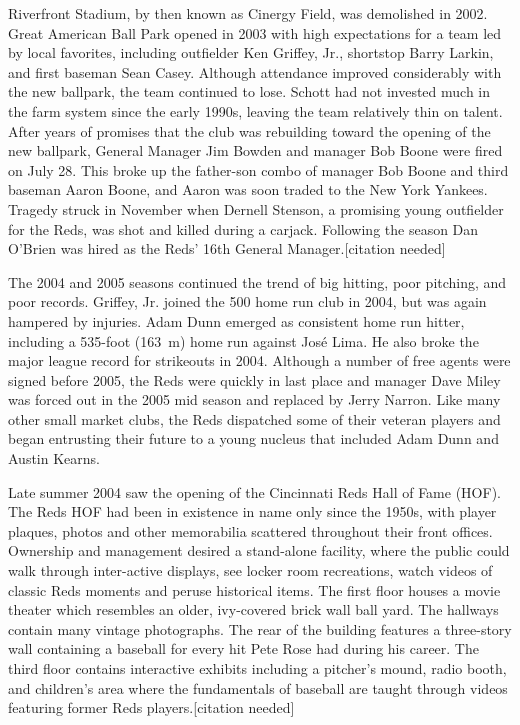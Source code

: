Riverfront Stadium, by then known as Cinergy Field, was demolished in
2002. Great American Ball Park opened in 2003 with high expectations for
a team led by local favorites, including outfielder Ken Griffey, Jr.,
shortstop Barry Larkin, and first baseman Sean Casey. Although
attendance improved considerably with the new ballpark, the team
continued to lose. Schott had not invested much in the farm system since
the early 1990s, leaving the team relatively thin on talent. After years
of promises that the club was rebuilding toward the opening of the new
ballpark, General Manager Jim Bowden and manager Bob Boone were fired on
July 28. This broke up the father-son combo of manager Bob Boone and
third baseman Aaron Boone, and Aaron was soon traded to the New York
Yankees. Tragedy struck in November when Dernell Stenson, a promising
young outfielder for the Reds, was shot and killed during a carjack.
Following the season Dan O'Brien was hired as the Reds' 16th General
Manager.{[}citation needed{]}

The 2004 and 2005 seasons continued the trend of big hitting, poor
pitching, and poor records. Griffey, Jr. joined the 500 home run club in
2004, but was again hampered by injuries. Adam Dunn emerged as
consistent home run hitter, including a 535-foot (163~m) home run
against José Lima. He also broke the major league record for strikeouts
in 2004. Although a number of free agents were signed before 2005, the
Reds were quickly in last place and manager Dave Miley was forced out in
the 2005 mid season and replaced by Jerry Narron. Like many other small
market clubs, the Reds dispatched some of their veteran players and
began entrusting their future to a young nucleus that included Adam Dunn
and Austin Kearns.

Late summer 2004 saw the opening of the Cincinnati Reds Hall of Fame
(HOF). The Reds HOF had been in existence in name only since the 1950s,
with player plaques, photos and other memorabilia scattered throughout
their front offices. Ownership and management desired a stand-alone
facility, where the public could walk through inter-active displays, see
locker room recreations, watch videos of classic Reds moments and peruse
historical items. The first floor houses a movie theater which resembles
an older, ivy-covered brick wall ball yard. The hallways contain many
vintage photographs. The rear of the building features a three-story
wall containing a baseball for every hit Pete Rose had during his
career. The third floor contains interactive exhibits including a
pitcher's mound, radio booth, and children's area where the fundamentals
of baseball are taught through videos featuring former Reds
players.{[}citation needed{]}

